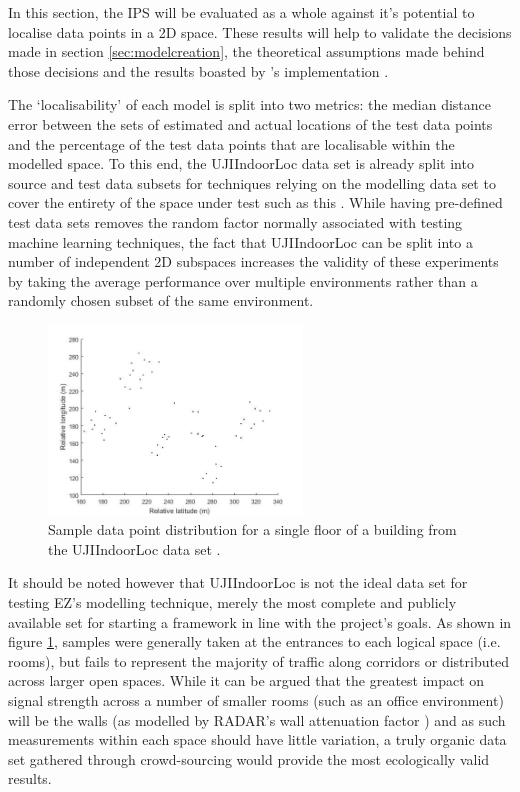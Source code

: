\documentclass{UoYCSproject}
\begin{document}
            In this section, the IPS will be evaluated as a whole against it's potential to localise data points in a 2D space. These results will help to validate the decisions made in section \ref{sec:modelcreation}, the theoretical assumptions made behind those decisions and the results boasted by \citeauthor{chintalapudi2010indoor}'s implementation \citep{chintalapudi2010indoor}.
            
            The `localisability' of each model is split into two metrics: the median distance error between the sets of estimated and actual locations of the test data points and the percentage of the test data points that are localisable within the modelled space. To this end, the UJIIndoorLoc data set is already split into source and test data subsets for techniques relying on the modelling data set to cover the entirety of the space under test such as this \citep{torres2014ujiindoorloc}. While having pre-defined test data sets removes the random factor normally associated with testing machine learning techniques, the fact that UJIIndoorLoc can be split into a number of independent 2D subspaces increases the validity of these experiments by taking the average performance over multiple environments rather than a randomly chosen subset of the same environment.
            
            \begin{figure}[h]
                \label{fig:datapoints}
                \centering
                \includegraphics[width=0.6\textwidth]{datapoints.jpg}
                \caption{Sample data point distribution for a single floor of a building from the UJIIndoorLoc data set \citep{torres2014ujiindoorloc}.}
            \end{figure}
            
            It should be noted however that UJIIndoorLoc is not the ideal data set for testing EZ's modelling technique, merely the most complete and publicly available set for starting a framework in line with the project's goals. As shown in figure \ref{fig:datapoints}, samples were generally taken at the entrances to each logical space (i.e. rooms), but fails to represent the majority of traffic along corridors or distributed across larger open spaces. While it can be argued that the greatest impact on signal strength across a number of smaller rooms (such as an office environment) will be the walls (as modelled by RADAR's wall attenuation factor \citep{bahl2000radar}) and as such measurements within each space should have little variation, a truly organic data set gathered through crowd-sourcing would provide the most ecologically valid results.
            
\end{document}
